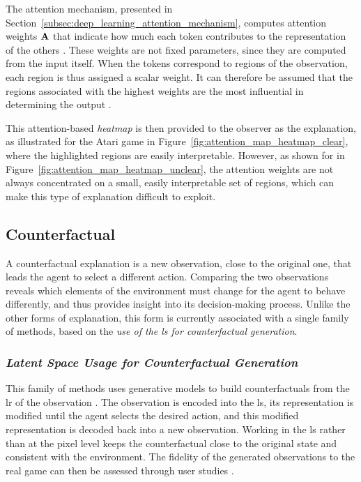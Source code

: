 The attention mechanism, presented in Section~\ref{subsec:deep_learning_attention_mechanism}, computes attention weights $\mathbf{A}$ that indicate how much each token contributes to the representation of the others \parencite{vaswani2017attention}.
These weights are not fixed parameters, since they are computed from the input itself.
When the tokens correspond to regions of the observation, each region is thus assigned a scalar weight.
It can therefore be assumed that the regions associated with the highest weights are the most influential in determining the output \parencite{mott2019towards, itaya2021visual}.

This attention-based \textit{heatmap} is then provided to the observer as the explanation, as illustrated for the Atari game \BreakoutName in Figure~\ref{fig:attention_map_heatmap_clear}, where the highlighted regions are easily interpretable.
However, as shown for \MsPacManName in Figure~\ref{fig:attention_map_heatmap_unclear}, the attention weights are not always concentrated on a small, easily interpretable set of regions, which can make this type of explanation difficult to exploit.



\subsection{Counterfactual}
\label{subsec:counterfactual}

A counterfactual explanation is a new observation, close to the original one, that leads the agent to select a different action.
Comparing the two observations reveals which elements of the environment must change for the agent to behave differently, and thus provides insight into its decision-making process.
Unlike the other forms of explanation, this form is currently associated with a single family of methods, based on the \textit{use of the \gls{ls} for counterfactual generation}.

\subsubsection*{\textit{Latent Space Usage for Counterfactual Generation}}
\label{subsubsec:latent_space_counterfactual_generation}

This family of methods uses generative models to build counterfactuals from the \gls{lr} of the observation \parencite{bond2021deep, olson2021counterfactual}.
The observation is encoded into the \gls{ls}, its representation is modified until the agent selects the desired action, and this modified representation is decoded back into a new observation.
Working in the \gls{ls} rather than at the pixel level keeps the counterfactual close to the original state and consistent with the environment.
The fidelity of the generated observations to the real game can then be assessed through user studies \parencite{olson2021counterfactual}.

